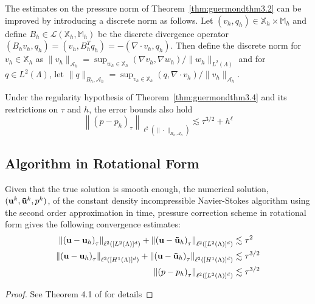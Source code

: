 \documentclass[letterpaper]{erdc}
\begin{document}
The estimates on the pressure norm of Theorem~\ref{thm:guermondthm3.2} can be
improved by introducing a discrete norm as follows.  Let
$(v_h,q_h) \in \mathbb{X}_h\times \mathbb{M}_h$ and define
$B_h \in \mathcal{L}(\mathbb{X}_h,\mathbb{M}_h)$ be the discrete divergence
operator $(B_h v_h, q_h) = (v_h, B_h^T q_h) = -(\nabla\cdot v_h, q_h)$.  Then
define the discrete norm for $v_h \in \mathbb{X}_h$ as
$\|v_h\|_{\mathcal{A}_h} = \sup_{w_h \in \mathbb{X}_h} (\nabla v_h, \nabla
w_h)/ \|w_h\|_{L^2(\Lambda)}$
and for $q\in L^2(\Lambda)$, let
$\|q\|_{B_h, \mathcal{A}_h} = \sup_{v_h\in \mathbb{X}_h} (q, \nabla\cdot v_h)/
\|v_h\|_{\mathcal{A}_h}$.

\begin{theorem}\label{thm:guermondthm3.5}
  Under the regularity hypothesis of Theorem~\ref{thm:guermondthm3.4} and its
  restrictions on $\tau$ and $h$, the error bounds also hold
    \begin{equation}
      \left\| \left(p - p_h \right)_{\tau} \right\|_{\ell^{2}\left(\|\cdot\|_{B_h, \mathcal{A}_h}\right)} \lesssim \tau^{3/2} + h^{\ell}
    \end{equation}
\end{theorem}


%
%
\subsection{Algorithm in Rotational Form}

\begin{theorem}
  Given that the true solution is smooth enough, the numerical solution,
  $(\textbf{u}^k, \mathbf{\tilde{u}}^k, p^k)$, of the constant density incompressible Navier-Stokes
  algorithm using the second order approximation in time, pressure correction
  scheme in rotational form gives the following convergence estimates:
\begin{align*}
\left\| \left(\textbf{u} - \textbf{u}_h\right)_{\tau} \right\|_{\ell^2\left([L^2(\Lambda)]^d \right)} + \left\| \left(\textbf{u} - \mathbf{\tilde{u}}_h\right)_{\tau} \right\|_{\ell^2\left([L^2(\Lambda)]^d \right)} &\lesssim \tau^2\\
\left\| \left(\textbf{u} - \textbf{u}_h\right)_{\tau} \right\|_{\ell^2\left([H^1(\Lambda)]^d \right)} + \left\| \left(\textbf{u} - \mathbf{\tilde{u}}_h\right)_{\tau} \right\|_{\ell^2\left([H^1(\Lambda)]^d \right)}  &\lesssim \tau^{3/2}\\
 \left\| \left(p - p_h\right)_{\tau} \right\|_{\ell^2\left([L^2(\Lambda)]^d \right)} &\lesssim \tau^{3/2}
\end{align*}

\end{theorem}
\begin{proof}
See Theorem 4.1 of \cite{guermond2004error} for details
\end{proof}
\end{document}
